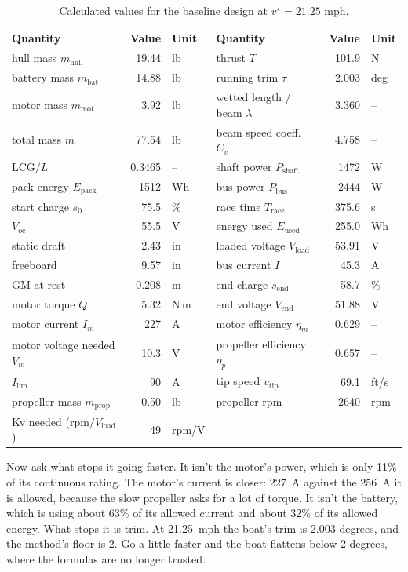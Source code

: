 \documentclass[11pt,a4paper]{article}
\renewcommand{\_}{\textunderscore\allowbreak}
\newcommand{\Trace}{T_{\mathrm{race}}}
\newcommand{\Pshaft}{P_{\mathrm{shaft}}}
\newcommand{\Pbus}{P_{\mathrm{bus}}}
\newcommand{\Eused}{E_{\mathrm{used}}}
\newcommand{\Epack}{E_{\mathrm{pack}}}
\newcommand{\Voc}{V_{\mathrm{oc}}}
\newcommand{\Vload}{V_{\mathrm{load}}}
\newcommand{\Vend}{V_{\mathrm{end}}}
\newcommand{\lcg}{\mathrm{LCG}}
\begin{document}
\begin{table}[H]
\centering\small
\caption{Calculated values for the baseline design at $v^\star=21.25$ mph.}
\begin{tabular}{@{}l r l @{\qquad} l r l@{}}
\toprule
Quantity & Value & Unit & Quantity & Value & Unit \\
\midrule
hull mass $m_{\mathrm{hull}}$ & 19.44 & lb & thrust $T$ & 101.9 & N \\
battery mass $m_{\mathrm{bat}}$ & 14.88 & lb & running trim $\tau$ & 2.003 & deg \\
motor mass $m_{\mathrm{mot}}$ & 3.92 & lb & wetted length / beam $\lambda$ & 3.360 & -- \\
total mass $m$ & 77.54 & lb & beam speed coeff.\ $C_v$ & 4.758 & -- \\
$\lcg/L$ & 0.3465 & -- & shaft power $\Pshaft$ & 1472 & W \\
pack energy $\Epack$ & 1512 & Wh & bus power $\Pbus$ & 2444 & W \\
start charge $s_0$ & 75.5 & \% & race time $\Trace$ & 375.6 & s \\
$\Voc$ & 55.5 & V & energy used $\Eused$ & 255.0 & Wh \\
static draft & 2.43 & in & loaded voltage $\Vload$ & 53.91 & V \\
freeboard & 9.57 & in & bus current $I$ & 45.3 & A \\
GM at rest & 0.208 & m & end charge $s_{\mathrm{end}}$ & 58.7 & \% \\
motor torque $Q$ & 5.32 & N\,m & end voltage $\Vend$ & 51.88 & V \\
motor current $I_m$ & 227 & A & motor efficiency $\eta_m$ & 0.629 & -- \\
motor voltage needed $V_m$ & 10.3 & V & propeller efficiency $\eta_p$ & 0.657 & -- \\
$I_{\lim}$ & 90 & A & tip speed $v_{\mathrm{tip}}$ & 69.1 & ft/s \\
propeller mass $m_{\mathrm{prop}}$ & 0.50 & lb & propeller rpm & 2640 & rpm \\
Kv needed ($\mathrm{rpm}/\Vload$) & 49 & rpm/V & & & \\
\bottomrule
\end{tabular}
\end{table}

Now ask what stops it going faster. It isn't the motor's power, which is only 11\% of its continuous rating. The motor's current is closer: 227~A against the 256~A it is allowed, because the slow propeller asks for a lot of torque. It isn't the battery, which is using about 63\% of its allowed current and about 32\% of its allowed energy.
What stops it is trim. At 21.25~mph the boat's trim is 2.003 degrees, and the method's floor is 2. Go a little faster and the boat flattens below 2 degrees, where the formulas are no longer trusted.
\end{document}
